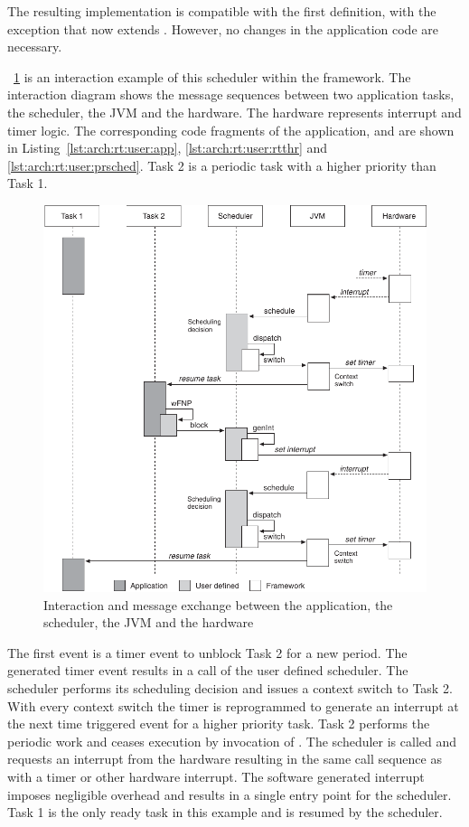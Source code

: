 The resulting implementation is compatible with the first
definition, with the exception that  now extends
. However, no changes in the application code are
necessary.

\figurename~\ref{fig_arch_rt_user_interaction} is an interaction
example of this scheduler within the framework. The interaction
diagram shows the message sequences between two application tasks,
the scheduler, the JVM and the hardware. The hardware represents
interrupt and timer logic. The corresponding code fragments of the
application,  and  are shown
in Listing~\ref{lst:arch:rt:user:app}, \ref{lst:arch:rt:user:rtthr}
and \ref{lst:arch:rt:user:prsched}. Task 2 is a periodic task with a
higher priority than Task 1.

\begin{figure}
    \centering
    \includegraphics[scale=\picscale]{runtime/rt_user_interaction}
    \caption[Interaction diagram of the user scheduler framework]
    {Interaction and message exchange between the application,
the scheduler, the JVM and the hardware}
    \label{fig_arch_rt_user_interaction}
\end{figure}

The first event is a timer event to unblock Task 2 for a new period.
The generated timer event results in a call of the user defined
scheduler. The scheduler performs its scheduling decision and issues
a context switch to Task 2. With every context switch the timer is
reprogrammed to generate an interrupt at the next time triggered
event for a higher priority task. Task 2 performs the periodic work
and ceases execution by invocation of .
The scheduler is called and requests an interrupt from the hardware
resulting in the same call sequence as with a timer or other
hardware interrupt. The software generated interrupt imposes
negligible overhead and results in a single entry point for the
scheduler. Task 1 is the only ready task in this example and is
resumed by the scheduler.

